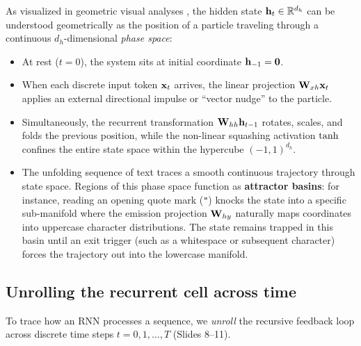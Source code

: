 \documentclass[../../main.tex]{subfiles}
\begin{document}
\begin{intuition}
As visualized in geometric visual analyses \cite{sanderson2024embeddings}, the hidden state $\mathbf{h}_t \in \mathbb{R}^{d_h}$ can be understood geometrically as the position of a particle traveling through a continuous $d_h$-dimensional \emph{phase space}:
\begin{itemize}
    \item At rest ($t=0$), the system sits at initial coordinate $\mathbf{h}_{-1} = \mathbf{0}$.
    \item When each discrete input token $\mathbf{x}_t$ arrives, the linear projection $\mathbf{W}_{xh} \mathbf{x}_t$ applies an external directional impulse or ``vector nudge'' to the particle.
    \item Simultaneously, the recurrent transformation $\mathbf{W}_{hh} \mathbf{h}_{t-1}$ rotates, scales, and folds the previous position, while the non-linear squashing activation $\tanh$ confines the entire state space within the hypercube $(-1, 1)^{d_h}$.
    \item The unfolding sequence of text traces a smooth continuous trajectory through state space. Regions of this phase space function as \textbf{attractor basins}: for instance, reading an opening quote mark (\texttt{"}) knocks the state into a specific sub-manifold where the emission projection $\mathbf{W}_{hy}$ naturally maps coordinates into uppercase character distributions. The state remains trapped in this basin until an exit trigger (such as a whitespace or subsequent character) forces the trajectory out into the lowercase manifold.
\end{itemize}
\end{intuition}

\subsection{Unrolling the recurrent cell across time}
To trace how an RNN processes a sequence, we \emph{unroll} the recursive feedback loop across discrete time steps $t = 0, 1, \dots, T$ (Slides 8--11).
\end{document}
